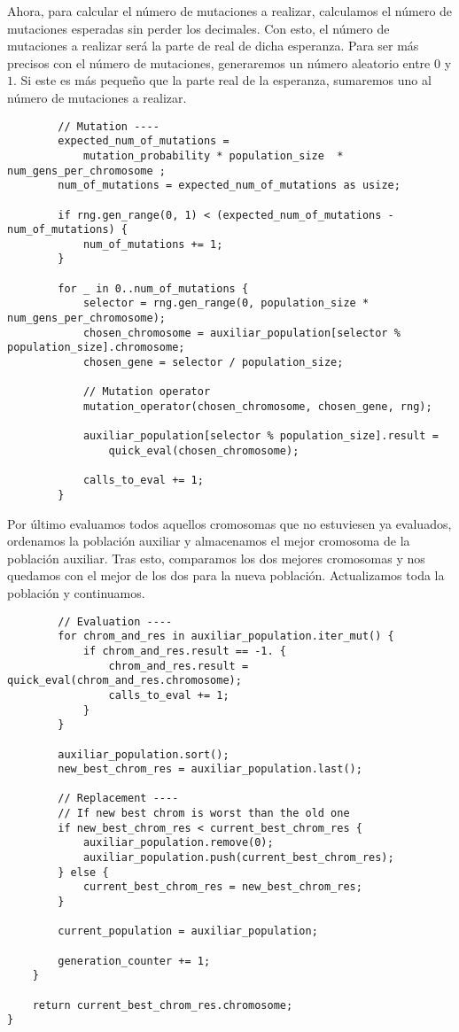 \documentclass[size=a4, parskip=half, titlepage=false, toc=flat, toc=bib, 12pt]{scrartcl}
\begin{document}
Ahora, para calcular el número de mutaciones a realizar, calculamos el número de mutaciones esperadas sin perder los decimales. Con esto, el número de mutaciones a realizar será la parte de real de dicha esperanza. Para ser más precisos con el número de mutaciones, generaremos un número aleatorio entre $0$ y $1$. Si este es más pequeño que la parte real de la esperanza, sumaremos uno al número de mutaciones a realizar.

\begin{verbatim}
        // Mutation ----
        expected_num_of_mutations =
            mutation_probability * population_size  * num_gens_per_chromosome ;
        num_of_mutations = expected_num_of_mutations as usize;

        if rng.gen_range(0, 1) < (expected_num_of_mutations - num_of_mutations) {
            num_of_mutations += 1;
        }

        for _ in 0..num_of_mutations {
            selector = rng.gen_range(0, population_size * num_gens_per_chromosome);
            chosen_chromosome = auxiliar_population[selector % population_size].chromosome;
            chosen_gene = selector / population_size;

            // Mutation operator
            mutation_operator(chosen_chromosome, chosen_gene, rng);

            auxiliar_population[selector % population_size].result =
                quick_eval(chosen_chromosome);

            calls_to_eval += 1;
        }

\end{verbatim}

Por último evaluamos todos aquellos cromosomas que no estuviesen ya evaluados, ordenamos la población auxiliar y almacenamos el mejor cromosoma de la población auxiliar. Tras esto, comparamos los dos mejores cromosomas y nos quedamos con el mejor de los dos para la nueva población. Actualizamos toda la población y continuamos.

\begin{verbatim}
        // Evaluation ----
        for chrom_and_res in auxiliar_population.iter_mut() {
            if chrom_and_res.result == -1. {
                chrom_and_res.result = quick_eval(chrom_and_res.chromosome);
                calls_to_eval += 1;
            }
        }

        auxiliar_population.sort();
        new_best_chrom_res = auxiliar_population.last();

        // Replacement ----
        // If new best chrom is worst than the old one
        if new_best_chrom_res < current_best_chrom_res {
            auxiliar_population.remove(0);
            auxiliar_population.push(current_best_chrom_res);
        } else {
            current_best_chrom_res = new_best_chrom_res;
        }

        current_population = auxiliar_population;

        generation_counter += 1;
    }

    return current_best_chrom_res.chromosome;
}
\end{verbatim}
\end{document}
